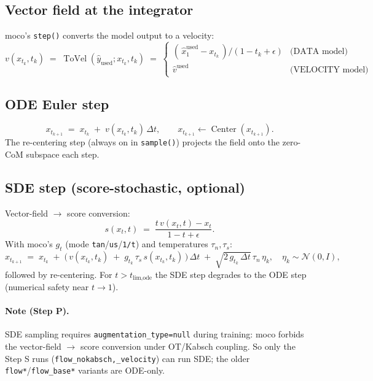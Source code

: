 \documentclass[11pt]{article}
\begin{document}
\subsection{Vector field at the integrator}
moco's \texttt{step()} converts the model output to a velocity:
\begin{equation}
v(x_{t_k}, t_k) \;=\; \operatorname{ToVel}(\hat{y}_{\text{used}}; x_{t_k}, t_k) \;=\; \begin{cases} (\,\hat{x}_{1}^{\text{used}} - x_{t_k}\,) / (1 - t_k + \epsilon) & \text{(DATA model)} \\ \hat{v}^{\text{used}} & \text{(VELOCITY model)} \end{cases}
\end{equation}

\subsection{ODE Euler step}
\begin{equation}
\boxed{\; x_{t_{k+1}} \;=\; x_{t_k} \;+\; v(x_{t_k}, t_k)\,\Delta t,\qquad x_{t_{k+1}} \leftarrow \operatorname{Center}(x_{t_{k+1}}). \;}
\end{equation}
The re-centering step (always on in \texttt{sample()}) projects the field onto the zero-CoM subspace each step.

\subsection{SDE step (score-stochastic, optional)}
Vector-field $\to$ score conversion:
\begin{equation}
s(x_t, t) \;=\; \frac{t \, v(x_t, t) - x_t}{1 - t + \epsilon}.
\end{equation}
With moco's $g_t$ (mode \texttt{tan}/\texttt{us}/\texttt{1/t}) and temperatures $\tau_n, \tau_s$:
\begin{equation}
x_{t_{k+1}} \;=\; x_{t_k} \;+\; \big(\,v(x_{t_k}, t_k) \;+\; g_{t_k}\,\tau_s\,s(x_{t_k}, t_k)\,\big)\,\Delta t \;+\; \sqrt{2\,g_{t_k}\,\Delta t}\,\tau_n\,\eta_k,\quad \eta_k \sim \mathcal{N}(0, I),
\end{equation}
followed by re-centering. For $t > t_{\text{lim,ode}}$ the SDE step degrades to the ODE step (numerical safety near $t \to 1$).

\paragraph{Note (Step P).} SDE sampling requires \texttt{augmentation\_type=null} during training: moco forbids the vector-field $\to$ score conversion under OT/Kabsch coupling. So only the Step S runs (\texttt{flow\_nokabsch{,\_velocity}}) can run SDE; the older \texttt{flow*}/\texttt{flow\_base*} variants are ODE-only.
\end{document}
